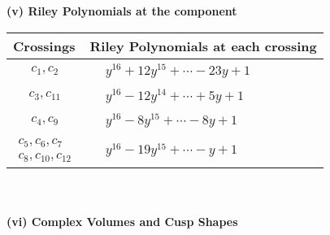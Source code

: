 \documentclass[1p]{elsarticle_modified}
\theoremstyle{definition}
\begin{document}
\newpage\renewcommand{\arraystretch}{1}
\flushleft \textbf{(v) Riley Polynomials at the component}\newline \\
\begin{tabular}{m{50pt}|m{274pt}}
Crossings & \hspace{64pt}Riley Polynomials at each crossing \\
\hline $$\begin{aligned}c_{1},c_{2}\end{aligned}$$&$\begin{aligned}
&y^{16}+12 y^{15}+\cdots-23 y+1
\end{aligned}$\\
\hline $$\begin{aligned}c_{3},c_{11}\end{aligned}$$&$\begin{aligned}
&y^{16}-12 y^{14}+\cdots+5 y+1
\end{aligned}$\\
\hline $$\begin{aligned}c_{4},c_{9}\end{aligned}$$&$\begin{aligned}
&y^{16}-8 y^{15}+\cdots-8 y+1
\end{aligned}$\\
\hline $$\begin{aligned}c_{5},c_{6},c_{7}\\c_{8},c_{10},c_{12}\end{aligned}$$&$\begin{aligned}
&y^{16}-19 y^{15}+\cdots- y+1
\end{aligned}$\\
\hline
\end{tabular}\\~\\
\newpage\flushleft \textbf{(vi) Complex Volumes and Cusp Shapes}
\end{document}
